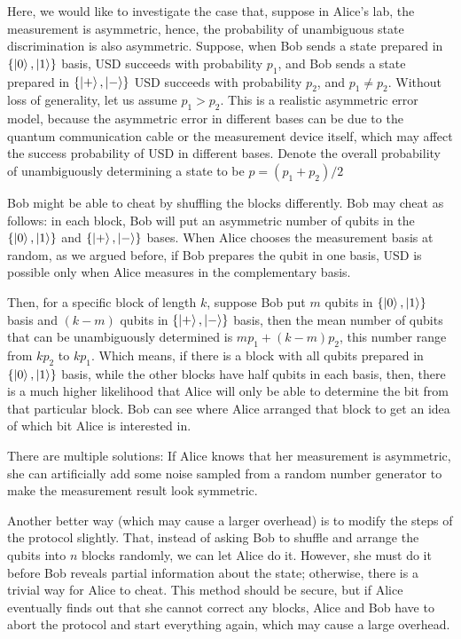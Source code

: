 \documentclass[%
 reprint,
superscriptaddress,
 amsmath,amssymb,
 aps,
]{revtex4-2}
\begin{document}
Here, we would like to investigate the case that, suppose in Alice's lab, the measurement is asymmetric, hence, the probability of unambiguous state discrimination is also asymmetric. Suppose, when Bob sends a state prepared in $\{\ket{0}, \ket{1}\}$ basis, USD succeeds with probability $p_1$, and Bob sends a state prepared in $\{\ket{+}, \ket{-}\}$ USD succeeds with probability $p_2$, and $p_1\ne p_2$. Without loss of generality, let us assume $p_1> p_2$. This is a realistic asymmetric error model, because the asymmetric error in different bases can be due to the quantum communication cable or the measurement device itself, which may affect the success probability of USD in different bases. Denote the overall probability of unambiguously determining a state to be $p=(p_1+p_2)/2$

Bob might be able to cheat by shuffling the blocks differently. Bob may cheat as follows: in each block, Bob will put an asymmetric number of qubits in the $\{\ket{0}, \ket{1}\}$ and $\{\ket{+}, \ket{-}\}$ bases. When Alice chooses the measurement basis at random, as we argued before, if Bob prepares the qubit in one basis, USD is possible only when Alice measures in the complementary basis.

Then, for a specific block of length $k$, suppose Bob put $m$ qubits in $\{\ket{0}, \ket{1}\}$ basis and $(k-m)$ qubits in $\{\ket{+}, \ket{-}\}$ basis, then the mean number of qubits that can be unambiguously determined is $mp_1+(k-m)p_2$, this number range from $kp_2$ to $kp_1$. Which means, if there is a block with all qubits prepared in $\{\ket{0}, \ket{1}\}$ basis, while the other blocks have half qubits in each basis, then, there is a much higher likelihood that Alice will only be able to determine the bit from that particular block. Bob can see where Alice arranged that block to get an idea of which bit Alice is interested in.

There are multiple solutions: If Alice knows that her measurement is asymmetric, she can artificially add some noise sampled from a random number generator to make the measurement result look symmetric. 

Another better way (which may cause a larger overhead) is to modify the steps of the protocol slightly. That, instead of asking Bob to shuffle and arrange the qubits into $n$ blocks randomly, we can let Alice do it. However, she must do it before Bob reveals partial information about the state; otherwise, there is a trivial way for Alice to cheat. This method should be secure, but if Alice eventually finds out that she cannot correct any blocks, Alice and Bob have to abort the protocol and start everything again, which may cause a large overhead.
\end{document}
